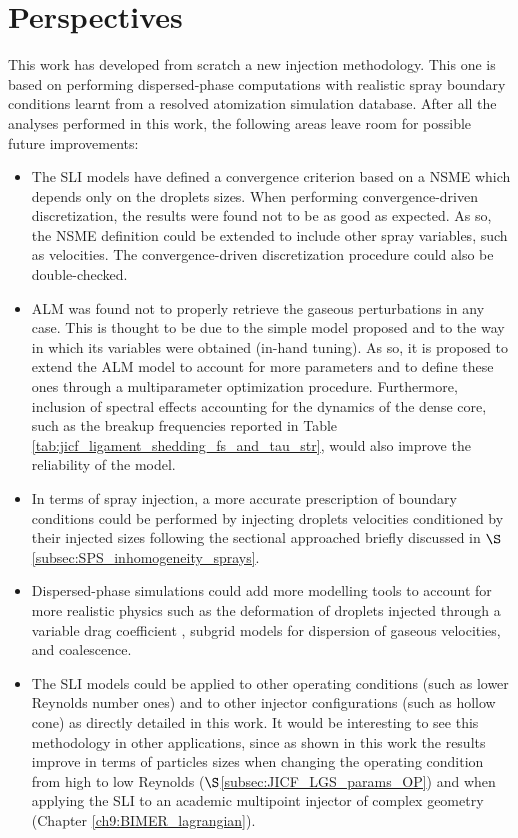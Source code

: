 \section*{Perspectives}

This work has developed from scratch a new injection methodology. This one is based on performing dispersed-phase computations with realistic spray boundary conditions learnt from a resolved atomization simulation database. After all the analyses performed in this work, the following areas leave room for possible future improvements:

\begin{itemize}

	\item The SLI models have defined a convergence criterion based on a NSME which depends only on the droplets sizes. When performing convergence-driven discretization, the results were found not to be as good as expected. As so, the NSME definition could be extended to include other spray variables, such as velocities. The convergence-driven discretization procedure could also be double-checked.
	
	\item ALM was found not to properly retrieve the gaseous perturbations in any case. This is thought to be due to the simple model proposed and to the way in which its variables were obtained (in-hand tuning). As so, it is proposed to extend the ALM model to account for more parameters and to define these ones through a multiparameter optimization procedure. Furthermore, inclusion of spectral effects accounting for the dynamics of the dense core, such as the breakup frequencies reported in Table \ref{tab:jicf_ligament_shedding_fs_and_tau_str}, would also improve the reliability of the model.
	
	\item In terms of spray injection, a more accurate prescription of boundary conditions could be performed by injecting droplets velocities conditioned by their injected sizes following the sectional approached briefly discussed in $\S$\ref{subsec:SPS_inhomogeneity_sprays}.
	
	\item Dispersed-phase simulations could add more modelling tools to account for more realistic physics such as the deformation of droplets injected through a variable drag coefficient , subgrid models for dispersion of gaseous velocities, and coalescence.
	
	\item The SLI models could be applied to other operating conditions (such as lower Reynolds number ones) and to other injector configurations (such as hollow cone) as directly detailed in this work. It would be interesting to see this methodology in other applications, since as shown in this work the results improve in terms of particles sizes when changing the operating condition from high to low Reynolds ($\S$\ref{subsec:JICF_LGS_params_OP}) and when applying the SLI to an academic multipoint injector of complex geometry (Chapter \ref{ch9:BIMER_lagrangian}).


\end{itemize} 

